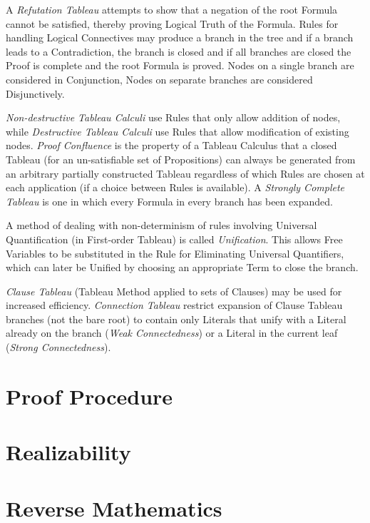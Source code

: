 A \emph{Refutation Tableau} attempts to show that a negation of the
root Formula cannot be satisfied, thereby proving Logical Truth of the
Formula. Rules for handling Logical Connectives may produce a branch
in the tree and if a branch leads to a Contradiction, the branch is
closed and if all branches are closed the Proof is complete and the
root Formula is proved. Nodes on a single branch are considered in
Conjunction, Nodes on separate branches are considered Disjunctively.

\emph{Non-destructive Tableau Calculi} use Rules that only allow
addition of nodes, while \emph{Destructive Tableau Calculi} use Rules
that allow modification of existing nodes. \emph{Proof Confluence} is
the property of a Tableau Calculus that a closed Tableau (for an
un-satisfiable set of Propositions) can always be generated from an
arbitrary partially constructed Tableau regardless of which Rules are
chosen at each application (if a choice between Rules is available). A
\emph{Strongly Complete Tableau} is one in which every Formula in
every branch has been expanded.

A method of dealing with non-determinism of rules involving Universal
Quantification (in First-order Tableau) is called
\emph{Unification}. This allows Free Variables to be substituted in
the Rule for Eliminating Universal Quantifiers, which can later be
Unified by choosing an appropriate Term to close the branch.

\emph{Clause Tableau} (Tableau Method applied to sets of Clauses) may
be used for increased efficiency. \emph{Connection Tableau} restrict
expansion of Clause Tableau branches (not the bare root) to contain
only Literals that unify with a Literal already on the branch
(\emph{Weak Connectedness}) or a Literal in the current leaf
(\emph{Strong Connectedness}).



\section{Proof Procedure}\label{sec:proof_procedure}

\section{Realizability} \label{sec:realizability}

\section{Reverse Mathematics} \label{sec:reverse_mathematics}
